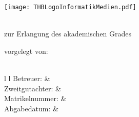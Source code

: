 \begin{titlepage}
\begin{center}

\texttt{[image: THBLogoInformatikMedien.pdf]}

\vspace{2cm}
{\LARGE \textsf{\textbf{\myTitel}} \par}
\vspace{0.5cm}
{\Large \textsf{\textbf{\myUntertitel}} \par}

\vspace{2cm}
{\Large \textsf{\textbf{\myThesisArt}} } \\

\vspace{1cm}
zur Erlangung des akademischen Grades\\
\vspace{0.5cm}
{\large \myAkademischerGrad}

\vspace{1.5cm}

vorgelegt von:\\
\vspace{0.5cm}
{\Large \myAutor} \\

\vfill
\begin{tblr}{ l l }
	Betreuer: & \myBetreuer \\
	Zweitgutachter: & \myZweitgutachter \\
	Matrikelnummer: & \myMatrikelNr \\
	Abgabedatum: & \myAbgabeDatum \\
\end{tblr}
\end{center}
\end{titlepage}
\restoregeometry %

